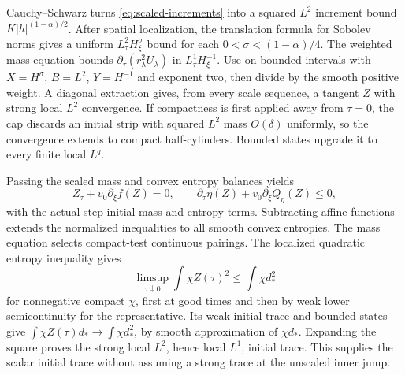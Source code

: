 Cauchy--Schwarz turns \eqref{eq:scaled-increments} into a squared
$L^2$ increment bound $K|h|^{(1-\alpha)/2}$. After spatial localization,
the translation formula for Sobolev norms gives a uniform
$L^2_\tau H^\sigma_\xi$ bound for each
$0<\sigma<(1-\alpha)/4$. The weighted mass equation bounds
$\partial_\tau(r_\lambda^2U_\lambda)$ in $L^1_\tau H^{-1}_\xi$.
Use \cite[Lemma~7.5]{Stan2016} on bounded intervals with
$X=H^\sigma$, $B=L^2$, $Y=H^{-1}$ and exponent two, then divide by the
smooth positive weight. A diagonal extraction gives, from every scale
sequence, a tangent $Z$ with strong local $L^2$ convergence.
If compactness is first applied away from $\tau=0$, the cap discards an
initial strip with squared $L^2$ mass $O(\delta)$ uniformly, so the
convergence extends to compact half-cylinders. Bounded states upgrade it
to every finite local $L^q$.

Passing the scaled mass and convex entropy balances yields
\begin{equation}\label{eq:scalar-limit}
 Z_\tau+v_0\partial_\xi f(Z)=0,\qquad
 \partial_\tau\eta(Z)+v_0\partial_\xi Q_\eta(Z)\leq0,
\end{equation}
with the actual step initial mass and entropy terms. Subtracting affine
functions extends the normalized inequalities to all smooth convex
entropies. The mass equation selects compact-test continuous pairings.
The localized quadratic entropy inequality gives
\[
 \limsup_{\tau\downarrow0}\int\chi Z(\tau)^2
 \leq\int\chi d_*^2
\]
for nonnegative compact $\chi$, first at good times and then by weak
lower semicontinuity for the representative. Its weak initial trace and
bounded states give $\int\chi Z(\tau)d_*\to\int\chi d_*^2$, by smooth
approximation of $\chi d_*$. Expanding the square proves the strong
local $L^2$, hence local $L^1$, initial trace. This supplies the scalar
initial trace without assuming a strong trace at the unscaled inner jump.

